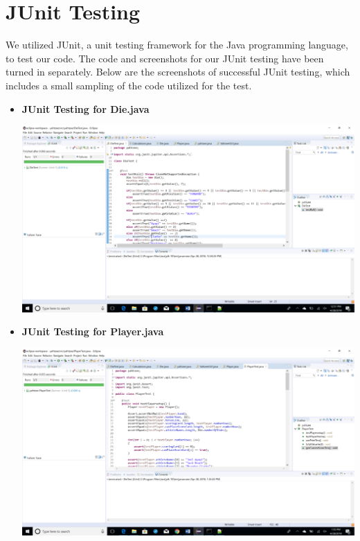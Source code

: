 \documentclass[]{report}   %
\begin{document}
\section{JUnit Testing}     %
We utilized JUnit, a unit testing framework for the Java programming language, to test our code. The code and screenshots for our JUnit testing have been turned in separately. Below are the screenshots of successful JUnit testing, which includes a small sampling of the code utilized for the test.
\begin{itemize}

\item \textbf{JUnit Testing for Die.java}
\begin{center}
\includegraphics[width=6in]{Graphics/JUnitTestDieTestScreenshot.png}
\end{center}

\vspace{.2in}

\item \textbf{JUnit Testing for Player.java} 
\begin{center}
\includegraphics[width=6in]{Graphics/JUnitTestPlayerTestScreenshot.png}
\end{center}


\end{itemize}
\end{document}
